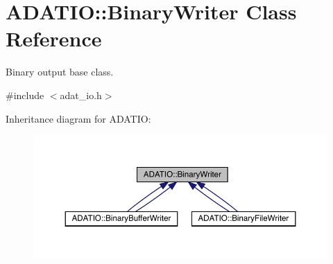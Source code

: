 \hypertarget{classADATIO_1_1BinaryWriter}{}\section{A\+D\+A\+T\+IO\+:\+:Binary\+Writer Class Reference}
\label{classADATIO_1_1BinaryWriter}


Binary output base class.  




{\ttfamily \#include $<$adat\+\_\+io.\+h$>$}



Inheritance diagram for A\+D\+A\+T\+IO\+:\nopagebreak
\begin{figure}[H]
\begin{center}
\leavevmode
\includegraphics[width=350pt]{d2/df0/classADATIO_1_1BinaryWriter__inherit__graph}
\end{center}
\end{figure}
